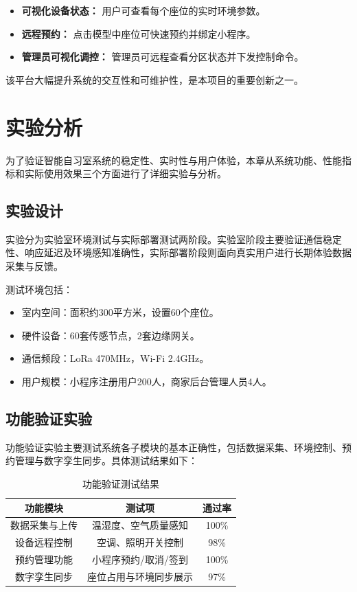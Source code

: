 \documentclass[12pt,a4paper]{IEEEtran} %
\begin{document}
\begin{itemize}
  \item \textbf{可视化设备状态：} 用户可查看每个座位的实时环境参数。
  \item \textbf{远程预约：} 点击模型中座位可快速预约并绑定小程序。
  \item \textbf{管理员可视化调控：} 管理员可远程查看分区状态并下发控制命令。
\end{itemize}

该平台大幅提升系统的交互性和可维护性，是本项目的重要创新之一。

\section{实验分析}
为了验证智能自习室系统的稳定性、实时性与用户体验，本章从系统功能、性能指标和实际使用效果三个方面进行了详细实验与分析。

\subsection{实验设计}
实验分为实验室环境测试与实际部署测试两阶段。实验室阶段主要验证通信稳定性、响应延迟及环境感知准确性，实际部署阶段则面向真实用户进行长期体验数据采集与反馈。

测试环境包括：
\begin{itemize}
  \item 室内空间：面积约300平方米，设置60个座位。
  \item 硬件设备：60套传感节点，2套边缘网关。
  \item 通信频段：LoRa 470MHz，Wi-Fi 2.4GHz。
  \item 用户规模：小程序注册用户200人，商家后台管理人员4人。
\end{itemize}

\subsection{功能验证实验}
功能验证实验主要测试系统各子模块的基本正确性，包括数据采集、环境控制、预约管理与数字孪生同步。具体测试结果如下：

\begin{table}[H]
  \centering
  \caption{功能验证测试结果}
  \label{tab:functional}
  \begin{tabular}{|c|c|c|}
    \hline
    \textbf{功能模块} & \textbf{测试项} & \textbf{通过率} \\ \hline
    数据采集与上传       & 温湿度、空气质量感知   & 100\%        \\ \hline
    设备远程控制        & 空调、照明开关控制    & 98\%         \\ \hline
    预约管理功能        & 小程序预约/取消/签到  & 100\%        \\ \hline
    数字孪生同步        & 座位占用与环境同步展示  & 97\%         \\ \hline
  \end{tabular}
\end{table}
\end{document}

